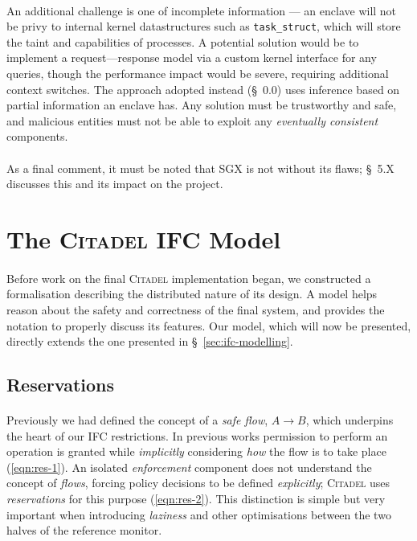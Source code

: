 \paragraph{} An additional challenge is one of incomplete information --- an enclave will not be privy to internal kernel datastructures such as \texttt{task\_struct}, which will store the taint and capabilities of processes. A potential solution would be to implement a request---response model via a custom kernel interface for any queries, though the performance impact would be severe, requiring additional context switches. The approach adopted instead (§~0.0) uses inference based on partial information an enclave has. Any solution must be trustworthy and safe, and malicious entities must not be able to exploit any \textit{eventually consistent} components.~\cite{10.1145/1435417.1435432}

\paragraph{} As a final comment, it must be noted that SGX is not without its flaws; §~5.X discusses this and its impact on the project.



\section{The \textsc{Citadel} IFC Model}

\paragraph{} Before work on the final \textsc{Citadel} implementation began, we constructed a formalisation describing the distributed nature of its design. A model helps reason about the safety and correctness of the final system, and provides the notation to properly discuss its features. Our model, which will now be presented, directly extends the one presented in §~\ref{sec:ifc-modelling}.

\subsection{Reservations}

\paragraph{} Previously we had defined the concept of a \textit{safe flow}, $A \rightarrow B$, which underpins the heart of our IFC restrictions. In previous works permission to perform an operation is granted while \textit{implicitly} considering \textit{how} the flow is to take place (\ref{eqn:res-1}). An isolated \textit{enforcement} component does not understand the concept of \textit{flows}, forcing policy decisions to be defined \textit{explicitly}; \textsc{Citadel} uses \textit{reservations} for this purpose (\ref{eqn:res-2}). This distinction is simple but very important when introducing \textit{laziness} and other optimisations between the two halves of the reference monitor.


